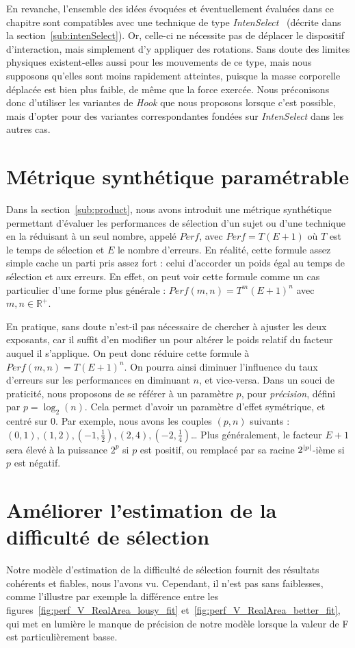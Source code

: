 	En revanche, l'ensemble des idées évoquées et éventuellement évaluées dans ce chapitre sont compatibles avec une technique de type \emph{IntenSelect}~\cite{de2005intenselect} (décrite dans la section~\ref{sub:intenSelect}). Or, celle-ci ne nécessite pas de déplacer le dispositif d'interaction, mais simplement d'y appliquer des rotations. Sans doute des limites physiques existent-elles aussi pour les mouvements de ce type, mais nous supposons qu'elles sont moins rapidement atteintes, puisque la masse corporelle déplacée est bien plus faible, de même que la force exercée. Nous préconisons donc d'utiliser les variantes de \emph{Hook} que nous proposons lorsque c'est possible, mais d'opter pour des variantes correspondantes fondées sur \emph{IntenSelect} dans les autres cas.
	
	\section{Métrique synthétique paramétrable}
	Dans la section~\ref{sub:product}, nous avons introduit une métrique synthétique permettant d'évaluer les performances de sélection d'un sujet ou d'une technique en la réduisant à un seul nombre, appelé $Perf$, avec $Perf = T(E+1)$ où $T$ est le temps de sélection et $E$ le nombre d'erreurs. En réalité, cette formule assez simple cache un parti pris assez fort : celui d'accorder un poids égal au temps de sélection et aux erreurs. En effet, on peut voir cette formule comme un cas particulier d'une forme plus générale : $Perf(m,n) = T^{m}(E+1)^{n}$ avec $m, n \in \mathbb{R}^{+}$.
	
	En pratique, sans doute n'est-il pas nécessaire de chercher à ajuster les deux exposants, car il suffit d'en modifier un pour altérer le poids relatif du facteur auquel il s'applique. On peut donc réduire cette formule à $Perf(m,n) = T(E+1)^{n}$. On pourra ainsi diminuer l'influence du taux d'erreurs sur les performances en diminuant $n$, et vice-versa. Dans un souci de praticité, nous proposons de se référer à un paramètre $p$, pour \emph{précision}, défini par $p = \log_2\left(n\right)$. Cela permet d'avoir un paramètre d'effet symétrique, et centré sur 0. Par exemple, nous avons les couples $(p,n)$ suivants : $\left(0,1\right), \left(1,2\right), \left(-1,\frac{1}{2}\right), \left(2,4\right), \left(-2,\frac{1}{4}\right)$\ldots{} Plus généralement, le facteur $E+1$ sera élevé à la puissance $2^{p}$ si $p$ est positif, ou remplacé par sa racine $2^{\abs*{p}}$-ième si $p$ est négatif.
	
	\section{Améliorer l'estimation de la difficulté de sélection}
	Notre modèle d'estimation de la difficulté de sélection fournit des résultats cohérents et fiables, nous l'avons vu. Cependant, il n'est pas sans faiblesses, comme l'illustre par exemple la différence entre les figures~\ref{fig:perf_V_RealArea_lousy_fit} et~\ref{fig:perf_V_RealArea_better_fit}, qui met en lumière le manque de précision de notre modèle lorsque la valeur de F est particulièrement basse.
	
